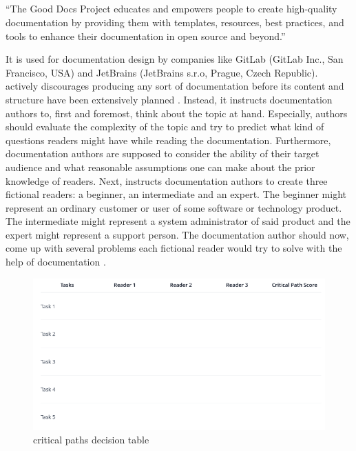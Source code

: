 \subsection{\good}\label{s:b-gooddocs}
\begin{displayquote}
	``The Good Docs Project educates and empowers people to create high-quality documentation by providing them with templates, resources, best practices, and tools to enhance their documentation in open source and beyond.''
\end{displayquote}
It is used for documentation design by companies like GitLab (GitLab Inc., San Francisco, USA) and JetBrains (JetBrains s.r.o, Prague, Czech Republic).
\good\space actively discourages producing any sort of documentation before its content and structure have been extensively planned \cite{shorterGoodDocsProject2024}.
Instead, it instructs documentation authors to, first and foremost, think about the topic at hand.
Especially, authors should evaluate the complexity of the topic and try to predict what kind of questions readers might have while reading the documentation.
Furthermore, documentation authors are supposed to consider the ability of their target audience and what reasonable assumptions one can make about the prior knowledge of
readers.
Next, \good\space instructs documentation authors to create three fictional readers: a beginner, an intermediate and an expert.
The beginner might represent an ordinary customer or user of some software or technology product.
The intermediate might represent a system administrator of said product
and the expert might represent a support person.
The documentation author should now, come up with several problems each fictional reader would try to solve with the help of documentation \cite{shorterGoodDocsProject2024}.
\begin{figure}[h]
	\centerline{
		\includegraphics[scale=0.5]{images/gd_dt.png}}
	\caption{\good\space critical paths decision table \cite{shorterGoodDocsProject2024}}\label{fig:dg-dt}
\end{figure}

